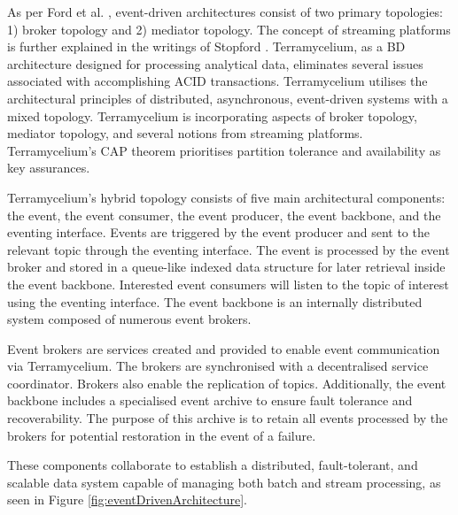 \documentclass[preprint,12pt]{elsarticle}
\begin{document}
As per Ford et al. \cite{Ford2021SoftwareArchitecture}, event-driven architectures consist of two primary topologies: 1) broker topology and 2) mediator topology. The concept of streaming platforms is further explained in the writings of Stopford \cite{stopford2018designing}. Terramycelium, as a BD architecture designed for processing analytical data, eliminates several issues associated with accomplishing ACID transactions. Terramycelium utilises the architectural principles of distributed, asynchronous, event-driven systems with a mixed topology. Terramycelium is incorporating aspects of broker topology, mediator topology, and several notions from streaming platforms. Terramycelium's CAP theorem \cite{simon2000brewer} prioritises partition tolerance and availability as key assurances. 

Terramycelium's hybrid topology consists of five main architectural components: the event, the event consumer, the event producer, the event backbone, and the eventing interface. Events are triggered by the event producer and sent to the relevant topic through the eventing interface. The event is processed by the event broker and stored in a queue-like indexed data structure for later retrieval inside the event backbone. Interested event consumers will listen to the topic of interest using the eventing interface. The event backbone is an internally distributed system composed of numerous event brokers. 

Event brokers are services created and provided to enable event communication via Terramycelium. The brokers are synchronised with a decentralised service coordinator. Brokers also enable the replication of topics. Additionally, the event backbone includes a specialised event archive to ensure fault tolerance and recoverability. The purpose of this archive is to retain all events processed by the brokers for potential restoration in the event of a failure. 

These components collaborate to establish a distributed, fault-tolerant, and scalable data system capable of managing both batch and stream processing, as seen in Figure \ref{fig:eventDrivenArchitecture}. 
\end{document}
